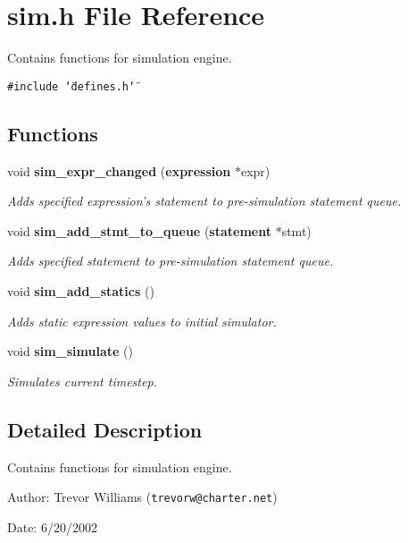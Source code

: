 \section{sim.h File Reference}
\label{sim_8h}
Contains functions for simulation engine. 


{\tt \#include \char`\"{}defines.h\char`\"{}}\par
\subsection*{Functions}
\begin{CompactItemize}
\item 
void {\bf sim\_\-expr\_\-changed} ({\bf expression} $\ast$expr)
\begin{CompactList}\small\item\em Adds specified expression's statement to pre-simulation statement queue.\item\end{CompactList}\item 
void {\bf sim\_\-add\_\-stmt\_\-to\_\-queue} ({\bf statement} $\ast$stmt)
\begin{CompactList}\small\item\em Adds specified statement to pre-simulation statement queue.\item\end{CompactList}\item 
void {\bf sim\_\-add\_\-statics} ()
\begin{CompactList}\small\item\em Adds static expression values to initial simulator.\item\end{CompactList}\item 
void {\bf sim\_\-simulate} ()
\begin{CompactList}\small\item\em Simulates current timestep.\item\end{CompactList}\end{CompactItemize}


\subsection{Detailed Description}
Contains functions for simulation engine.

\begin{Desc}
\item[Author:]Trevor Williams ({\tt trevorw@charter.net}) \end{Desc}
\begin{Desc}
\item[Date:]6/20/2002 \end{Desc}


